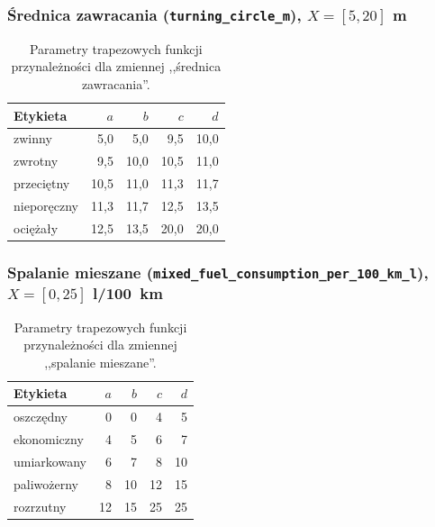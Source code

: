 \documentclass{article}
\begin{document}
\subsubsection{Średnica zawracania (\texttt{turning\_circle\_m}), $X = [5, 20]$ m}
\begin{table}[H]
\centering
\caption{Parametry trapezowych funkcji przynależności dla zmiennej
,,średnica zawracania''.}
\label{tab:mf-turn}
\begin{tabular}{l r r r r}
\toprule
Etykieta & $a$ & $b$ & $c$ & $d$ \\
\midrule
zwinny       &  5{,}0 &  5{,}0 &  9{,}5 & 10{,}0 \\
zwrotny      &  9{,}5 & 10{,}0 & 10{,}5 & 11{,}0 \\
przeciętny   & 10{,}5 & 11{,}0 & 11{,}3 & 11{,}7 \\
nieporęczny  & 11{,}3 & 11{,}7 & 12{,}5 & 13{,}5 \\
ociężały     & 12{,}5 & 13{,}5 & 20{,}0 & 20{,}0 \\
\bottomrule
\end{tabular}
\end{table}

\subsubsection{Spalanie mieszane (\texttt{mixed\_fuel\_consumption\_per\_100\_km\_l}), $X = [0, 25]$ l/100~km}
\begin{table}[H]
\centering
\caption{Parametry trapezowych funkcji przynależności dla zmiennej
,,spalanie mieszane''.}
\label{tab:mf-fuel}
\begin{tabular}{l r r r r}
\toprule
Etykieta & $a$ & $b$ & $c$ & $d$ \\
\midrule
oszczędny    &  0 &  0 &  4 &  5 \\
ekonomiczny  &  4 &  5 &  6 &  7 \\
umiarkowany  &  6 &  7 &  8 & 10 \\
paliwożerny  &  8 & 10 & 12 & 15 \\
rozrzutny    & 12 & 15 & 25 & 25 \\
\bottomrule
\end{tabular}
\end{table}
\end{document}
